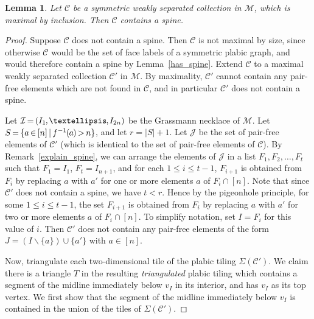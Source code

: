 \documentclass[10pt]{amsart}
\newtheorem{lemm}[theo]{Lemma}
\theoremstyle{definition}
\newcommand*{\mk}{\mkern -1mu}
\newcommand*{\Mk}{\mkern -2mu}
\begin{document}
\begin{lemm}\label{spine}Let $\mathcal{C}$ be a symmetric weakly separated collection in $\mathcal{M}$, which is maximal by inclusion. Then $\mathcal{C}$ contains a spine.
\end{lemm}

\begin{proof}
Suppose $\mathcal{C}$ does not contain a spine. Then $\mathcal{C}$ is not maximal by size, since otherwise $\mathcal{C}$ would be the set of face labels of a symmetric plabic graph, and would therefore contain a spine by Lemma~\ref{has_spine}. Extend $\mathcal{C}$ to a maximal weakly separated collection $\mathcal{C}'$ in $\mathcal{M}$. By maximality, $\mathcal{C}'$ cannot contain any pair-free elements which are not found in $\mathcal{C}$, and in particular $\mathcal{C}'$ does not contain a spine. 

Let $\mathcal{I} \Mk =\Mk  (I_1\mk,\mk\ldots\mk,\mk I_{2n})$ be the Grassmann necklace of $\mathcal{M}$. Let 
\hbox{$S \Mk =\Mk  \{a \Mk \in \Mk [n] \Mk \mid \Mk f^{-1}\mk(\mk a\mk ) \Mk >\Mk  n\}\mk$,} and let $r = |S| + 1$. Let $\mathcal{J}$ be the set of pair-free elements of $\mathcal{C}'$ (which is identical to the set of pair-free elements of $\mathcal{C}$). By Remark~\ref{explain_spine}, we can arrange the elements of $\mathcal{J}$ in a list $F_1,F_2,\ldots,F_t$ such that $F_1 = I_1$, $F_t = I_{n+1}$, and for each $1 \leq i \leq t-1$, $F_{i+1}$ is obtained from $F_i$ by replacing $a$ with $a'$ for one or more elements $a$ of $F_i \cap [n]$. Note that since $\mathcal{C}'$ does not contain a spine, we have $t < r$. Hence by the pigeonhole principle, for some $1 \leq i \leq t-1$, the set $F_{i+1}$ is obtained from $F_i$ by replacing $a$ with $a'$ for two or more elements $a$ of $F_i \cap [n]$. To simplify notation, set $I = F_i$ for this value of $i$. Then $\mathcal{C}'$ does not contain any pair-free elements of the form $J = (I \backslash \{a\}) \cup \{a'\}$ with $a \in [n]$. 

Now, triangulate each two-dimensional tile of the plabic tiling $\Sigma(\mathcal{C}')$. 
We claim there is a triangle $T$ in the resulting \emph{triangulated} plabic tiling which contains a segment of the midline immediately below $v_I$ in its interior, and has $v_I$ as its top vertex. We first show that the segment of the midline immediately below $v_{I}$ is contained in the union of the tiles of $\Sigma(\mathcal{C}')$.


\end{proof}
\end{document}

